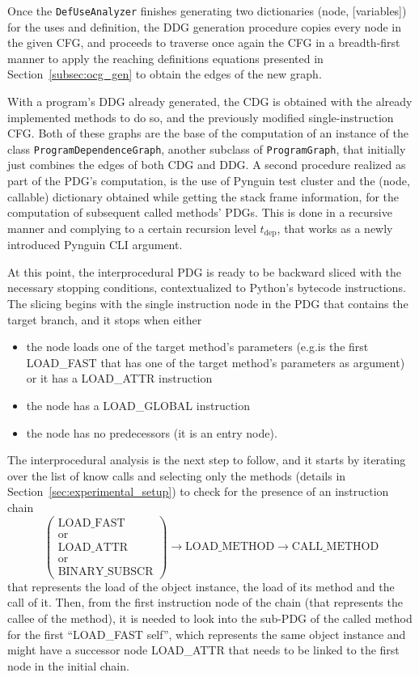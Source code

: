 \documentclass[%
  chapterprefix=false,%
  open=right,%
  twoside=true,%
  paper=a4,%
  logofile={Figures/logo.png},%
  thesistype=master,%
  UKenglish,%
]{se2thesis}
\newcommand{\classname}[1]{\texttt{#1}}
\begin{document}

Once the \classname{DefUseAnalyzer} finishes generating two dictionaries (node, [variables]) for the uses and definition, the DDG generation procedure copies every node in the given CFG, and proceeds to traverse once again the CFG in a breadth-first manner to apply the reaching definitions equations presented in Section~\ref{subsec:ocg_gen} to obtain the edges of the new graph.

With a program's DDG already generated, the CDG is obtained with the already implemented methods to do so, and the previously modified single-instruction CFG.\@
Both of these graphs are the base of the computation of an instance of the class \classname{ProgramDependenceGraph}, another subclass of \classname{ProgramGraph}, that initially just combines the edges of both CDG and DDG.\@
A second procedure realized as part of the PDG's computation, is the use of Pynguin test cluster and the (node, callable) dictionary obtained while getting the stack frame information, for the computation of subsequent called methods' PDGs.
This is done in a recursive manner and complying to a certain recursion level \(t_{\text{dep}}\), that works as a newly introduced Pynguin CLI argument. 

At this point, the interprocedural PDG is ready to be backward sliced with the necessary stopping conditions, contextualized to Python's bytecode instructions.
The slicing begins with the single instruction node in the PDG that contains the target branch, and it stops when either

\begin{itemize}
  \item the node loads one of the target method's parameters (e.g.\@it is the first LOAD\_FAST that has one of the target method's parameters as argument) or it has a LOAD\_ATTR instruction
  \item the node has a LOAD\_GLOBAL instruction
  \item the node has no predecessors (it is an entry node).
\end{itemize}

The interprocedural analysis is the next step to follow, and it starts by iterating over the list of know calls and selecting only the methods (details in Section~\ref{sec:experimental_setup}) to check for the presence of an instruction chain 
\[\begin{pmatrix} \text{LOAD\_FAST} \\ \text{or} \\ \text{LOAD\_ATTR} \\ \text{or} \\ \text{BINARY\_SUBSCR} \end{pmatrix} \rightarrow \text{LOAD\_METHOD} \rightarrow \text{CALL\_METHOD}\]
that represents the load of the object instance, the load of its method and the call of it.
Then, from the first instruction node of the chain (that represents the callee of the method), it is needed to look into the sub-PDG of the called method for the first ``LOAD\_FAST self'', which represents the same object instance and might have a successor node LOAD\_ATTR that needs to be linked to the first node in the initial chain.
\end{document}
